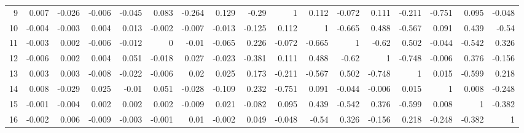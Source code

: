 \documentclass[12pt]{amsart}
\begin{document}
\begin{table}[h]
\begin{center}
{\begin{tabularx}{1.3\textwidth}{r| r r r r r r r r r r r r r r r r}
   9   &     0.007   &    -0.026   &    -0.006   &    -0.045   &     0.083   &    -0.264   &     0.129   &     -0.29   &         1   &     0.112   &    -0.072   &     0.111   &    -0.211   &    -0.751   &     0.095   &    -0.048     \\
   10   &    -0.004   &    -0.003   &     0.004   &     0.013   &    -0.002   &    -0.007   &    -0.013   &    -0.125   &     0.112   &         1   &    -0.665   &     0.488   &    -0.567   &     0.091   &     0.439   &     -0.54     \\
   11   &    -0.003   &     0.002   &    -0.006   &    -0.012   &         0   &     -0.01   &    -0.065   &     0.226   &    -0.072   &    -0.665   &         1   &     -0.62   &     0.502   &    -0.044   &    -0.542   &     0.326     \\
   12   &    -0.006   &     0.002   &     0.004   &     0.051   &    -0.018   &     0.027   &    -0.023   &    -0.381   &     0.111   &     0.488   &     -0.62   &         1   &    -0.748   &    -0.006   &     0.376   &    -0.156     \\
   13   &     0.003   &     0.003   &    -0.008   &    -0.022   &    -0.006   &      0.02   &     0.025   &     0.173   &    -0.211   &    -0.567   &     0.502   &    -0.748   &         1   &     0.015   &    -0.599   &     0.218     \\
   14   &     0.008   &    -0.029   &     0.025   &     -0.01   &     0.051   &    -0.028   &    -0.109   &     0.232   &    -0.751   &     0.091   &    -0.044   &    -0.006   &     0.015   &         1   &     0.008   &    -0.248     \\
   15   &    -0.001   &    -0.004   &     0.002   &     0.002   &     0.002   &    -0.009   &     0.021   &    -0.082   &     0.095   &     0.439   &    -0.542   &     0.376   &    -0.599   &     0.008   &         1   &    -0.382     \\
   16   &    -0.002   &     0.006   &    -0.009   &    -0.003   &    -0.001   &      0.01   &    -0.002   &     0.049   &    -0.048   &     -0.54   &     0.326   &    -0.156   &     0.218   &    -0.248   &    -0.382   &         1     \\

\end{tabularx}}
	\end{center}
\end{table}
\end{document}
